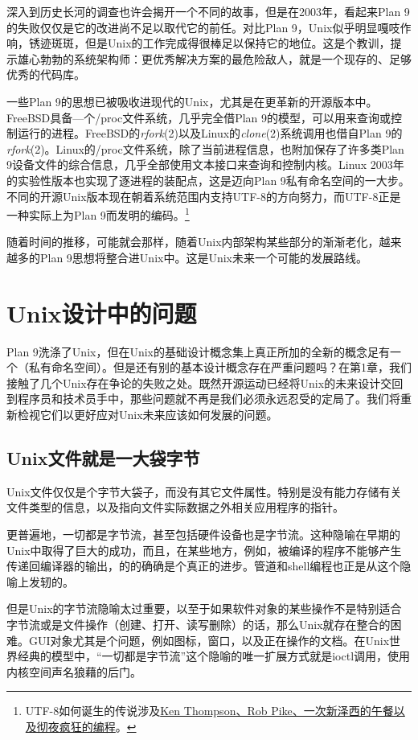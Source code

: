\documentclass[12pt,oneside]{ctexbook}
\begin{document}
\begin{common-format}
深入到历史长河的调查也许会揭开一个不同的故事，但是在2003年，看起来Plan 9的失败仅仅是它的改进尚不足以取代它的前任。对比Plan 9，Unix似乎明显嘎吱作响，锈迹斑斑，但是Unix的工作完成得很棒足以保持它的地位。这是个教训，提示雄心勃勃的系统架构师：更优秀解决方案的最危险敌人，就是一个现存的、足够优秀的代码库。

一些Plan 9的思想已被吸收进现代的Unix，尤其是在更革新的开源版本中。FreeBSD具备—个/proc文件系统，几乎完全借Plan 9的模型，可以用来查询或控制运行的进程。FreeBSD的\textit{rfork}(2)以及Linux的\textit{clone}(2)系统调用也借自Plan 9的\textit{rfork}(2)。Linux的/proc文件系统，除了当前进程信息，也附加保存了许多类Plan 9设备文件的综合信息，几乎全部使用文本接口来查询和控制内核。Linux 2003年的实验性版本也实现了逐进程的装配点，这是迈向Plan 9私有命名空间的一大步。不同的开源Unix版本现在朝着系统范围内支持UTF-8的方向努力，而UTF-8正是一种实际上为Plan 9而发明的编码。\footnote{UTF-8如何诞生的传说涉及\href{http://www.cl.cam.ac.uk/~mgk25/ucs/utf-8-history.txt}{Ken Thompson、Rob Pike、一次新泽西的午餐以及彻夜疯狂的编程}。}

随着时间的推移，可能就会那样，随着Unix内部架构某些部分的渐渐老化，越来越多的Plan 9思想将整合进Unix中。这是Unix未来一个可能的发展路线。

\section{Unix设计中的问题}
Plan 9洗涤了Unix，但在Unix的基础设计概念集上真正所加的全新的概念足有一个（私有命名空间）。但是还有别的基本设计概念存在严重问题吗？在第1章，我们接触了几个Unix存在争论的失败之处。既然开源运动已经将Unix的未来设计交回到程序员和技术员手中，那些问题就不再是我们必须永远忍受的定局了。我们将重新检视它们以更好应对Unix未来应该如何发展的问题。

\subsection{Unix文件就是一大袋字节}
Unix文件仅仅是个字节大袋子，而没有其它文件属性。特别是没有能力存储有关文件类型的信息，以及指向文件实际数据之外相关应用程序的指针。

更普遍地，一切都是字节流，甚至包括硬件设备也是字节流。这种隐喻在早期的Unix中取得了巨大的成功，而且，在某些地方，例如，被编译的程序不能够产生传递回编译器的输出，的的确确是个真正的进步。管道和shell编程也正是从这个隐喻上发轫的。

但是Unix的字节流隐喻太过重要，以至于如果软件对象的某些操作不是特别适合字节流或是文件操作（创建、打开、读写删除）的话，那么Unix就存在整合的困难。GUI对象尤其是个问题，例如图标，窗口，以及正在操作的文档。在Unix世界经典的模型中，“一切都是字节流”这个隐喻的唯一扩展方式就是ioctl调用，使用内核空间声名狼藉的后门。


\end{common-format}
\end{document}
